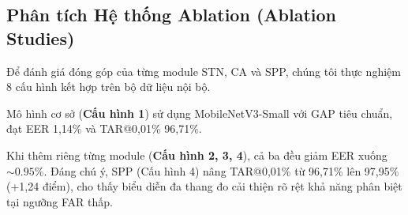 \documentclass[12pt,a4paper]{article}
\begin{document}
\subsection{Phân tích Hệ thống Ablation (Ablation Studies)}

Để đánh giá đóng góp của từng module STN, CA và SPP, chúng tôi thực nghiệm 8 cấu hình kết hợp trên bộ dữ liệu nội bộ.

\begin{table}[H]
\caption{Phân tích độ nhạy Ablation Study toàn diện của các mô-đun đề xuất trên giao thức Identity-Disjoint Open-Set}
\begin{center}
\label{tab:ablation}
\end{center}
\end{table}

Mô hình cơ sở (\textbf{Cấu hình 1}) sử dụng MobileNetV3-Small với GAP tiêu chuẩn, đạt EER 1,14\% và TAR@0,01\% 96,71\%.

Khi thêm riêng từng module (\textbf{Cấu hình 2, 3, 4}), cả ba đều giảm EER xuống $\sim 0.95\%$. Đáng chú ý, SPP (Cấu hình 4) nâng TAR@0,01\% từ 96,71\% lên 97,95\% (+1,24 điểm), cho thấy biểu diễn đa thang đo cải thiện rõ rệt khả năng phân biệt tại ngưỡng FAR thấp.
\end{document}
